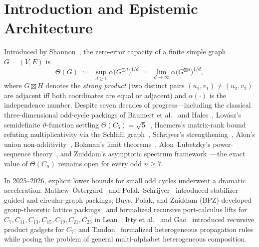 \documentclass[11pt,reqno]{amsart}
\theoremstyle{definition}
\newcommand{\sprod}{\boxtimes}
\begin{document}
\maketitle

\section{Introduction and Epistemic Architecture}\label{sec:intro}

Introduced by Shannon~\cite{shannon1956zero}, the zero-error capacity of a finite simple graph $G = (V,E)$ is
\[
  \Theta(G) \;:=\; \sup_{d \ge 1} \alpha\bigl(G^{\sprod d}\bigr)^{1/d} \;=\; \lim_{d\to\infty} \alpha\bigl(G^{\sprod d}\bigr)^{1/d},
\]
where $G \sprod H$ denotes the \emph{strong product} (two distinct pairs $(u_1,v_1)\neq(u_2,v_2)$ are adjacent iff both coordinates are equal or adjacent) and $\alpha(\cdot)$ is the independence number. Despite seven decades of progress---including the classical three-dimensional odd-cycle packings of Baumert et al.~\cite{baumert1971combinatorial} and Hales~\cite{hales1973numerical}, Lovász's semidefinite $\vartheta$-function settling $\Theta(C_5)=\sqrt{5}$~\cite{lovasz1979shannon}, Haemers's matrix-rank bound refuting multiplicativity via the Schläfli graph~\cite{haemers1979some}, Schrijver's strengthening~\cite{schrijver1979comparison}, Alon's union non-additivity~\cite{alon1998shannon}, Bohman's limit theorems~\cite{bohman2003limit,bohman2005limit2,bohman2003nontrivial}, Alon--Lubetzky's power-sequence theory~\cite{alon2006shannon}, and Zuiddam's asymptotic spectrum framework~\cite{zuiddam2019asymptotic}---the exact value of $\Theta(C_n)$ remains open for every odd $n \ge 7$.

In 2025--2026, explicit lower bounds for small odd cycles underwent a dramatic acceleration: Mathew--Östergård~\cite{mathew2017new} and Polak--Schrijver~\cite{polak2019new} introduced stabilizer-guided and circular-graph packings; Buys, Polak, and Zuiddam (BPZ) developed group-theoretic lattice packings~\cite{bpz2025group} and formalized recursive port-calculus lifts for $C_7, C_{11}, C_{13}, C_{15}, C_{19}, C_{21}, C_{23}$ in Lean~\cite{bpz2026lean}; Itty et al.~\cite{itty2026improved} and Gao~\cite{gao2026recursive} introduced recursive product gadgets for $C_7$; and Tandon~\cite{tandon2026strengthening} formalized heterogeneous propagation rules while posing the problem of general multi-alphabet heterogeneous composition.
\end{document}
